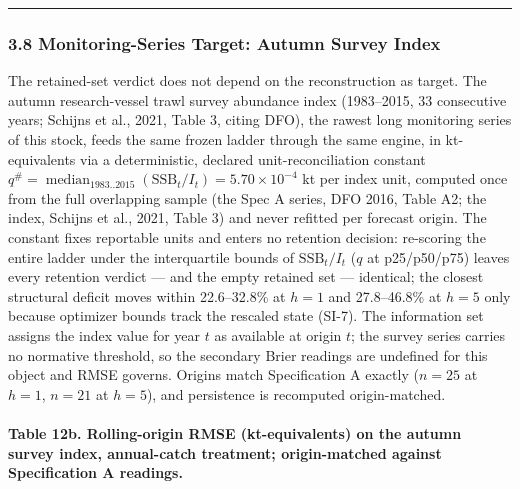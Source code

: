 \documentclass[11pt]{article}
\begin{document}
\begin{center}\rule{0.5\linewidth}{0.5pt}\end{center}

\subsubsection{3.8 Monitoring-Series Target: Autumn Survey
Index}\label{monitoring-series-target-autumn-survey-index}

The retained-set verdict does not depend on the reconstruction as
target. The autumn research-vessel trawl survey abundance index
(1983--2015, 33 consecutive years; Schijns et al., 2021, Table 3, citing
DFO), the rawest long monitoring series of this stock, feeds the same
frozen ladder through the same engine, in kt-equivalents via a
deterministic, declared unit-reconciliation constant
\(q^{\#} = \operatorname{median}_{1983..2015}(\mathrm{SSB}_t / I_t) = 5.70 \times 10^{-4}\)
kt per index unit, computed once from the full overlapping sample (the
Spec A series, DFO 2016, Table A2; the index, Schijns et al., 2021,
Table 3) and never refitted per forecast origin. The constant fixes
reportable units and enters no retention decision: re-scoring the entire
ladder under the interquartile bounds of \(\mathrm{SSB}_t/I_t\) (\(q\)
at p25/p50/p75) leaves every retention verdict --- and the empty
retained set --- identical; the closest structural deficit moves within
22.6--32.8\% at \(h=1\) and 27.8--46.8\% at \(h=5\) only because
optimizer bounds track the rescaled state (SI-7). The information set
assigns the index value for year \(t\) as available at origin \(t\); the
survey series carries no normative threshold, so the secondary Brier
readings are undefined for this object and RMSE governs. Origins match
Specification A exactly (\(n = 25\) at \(h=1\), \(n = 21\) at \(h=5\)),
and persistence is recomputed origin-matched.

\paragraph{Table 12b. Rolling-origin RMSE (kt-equivalents) on the autumn
survey index, annual-catch treatment; origin-matched against
Specification A
readings.}\label{table-12b.-rolling-origin-rmse-kt-equivalents-on-the-autumn-survey-index-annual-catch-treatment-origin-matched-against-specification-a-readings.}
\end{document}
